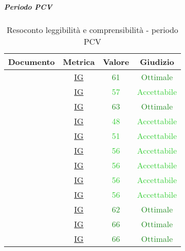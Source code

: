 							\subparagraph{Periodo PCV}
						
						\begin{table}[H]
							\centering
							\small
							\begin{tabular}{c | c | c | c}
								\hline
								\textbf{Documento} & \textbf{Metrica}    & \textbf{Valore} & \textbf{Giudizio} \\ \hline
								\pdpvtre        & \hyperref[MLEC]{IG} & \textcolor{ForestGreen}{61} & \textcolor{ForestGreen}{Ottimale} \\
								\pdqvtre        & \hyperref[MLEC]{IG} & \textcolor{LimeGreen}{57} & \textcolor{LimeGreen}{Accettabile} \\
								\ndpvtre        & \hyperref[MLEC]{IG} & \textcolor{ForestGreen}{63} & \textcolor{ForestGreen}{Ottimale} \\
								\adrvtre        & \hyperref[MLEC]{IG}  & \textcolor{LimeGreen}{48} & \textcolor{LimeGreen}{Accettabile} \\
								\stvdue		& \hyperref[MLEC]{IG}  & \textcolor{LimeGreen}{51} & \textcolor{LimeGreen}{Accettabile} \\
								\glvdue        & \hyperref[MLEC]{IG} & \textcolor{LimeGreen}{56} & \textcolor{LimeGreen}{Accettabile} \\
								\ddpvuno        & \hyperref[MLEC]{IG} & \textcolor{LimeGreen}{56} & \textcolor{LimeGreen}{Accettabile} \\
								\manutvuno        & \hyperref[MLEC]{IG} & \textcolor{LimeGreen}{56} & \textcolor{LimeGreen}{Accettabile} \\
								\manmanvuno        & \hyperref[MLEC]{IG} & \textcolor{LimeGreen}{56} & \textcolor{LimeGreen}{Accettabile} \\
								\vsesettei       & \hyperref[MLEC]{IG}& \textcolor{ForestGreen}{62} & \textcolor{ForestGreen}{Ottimale} \\
								\vottoi       & \hyperref[MLEC]{IG} &  \textcolor{ForestGreen}{66} & \textcolor{ForestGreen}{Ottimale} \\
								\vquattroe       & \hyperref[MLEC]{IG}& \textcolor{ForestGreen}{66} & \textcolor{ForestGreen}{Ottimale} \\
							\end{tabular}
							\caption{Resoconto leggibilità e comprensibilità - periodo PCV}
							\label{tab_resoconto_leggibilità_e_comprensibilità_PPCV}
						\end{table}
						
						
